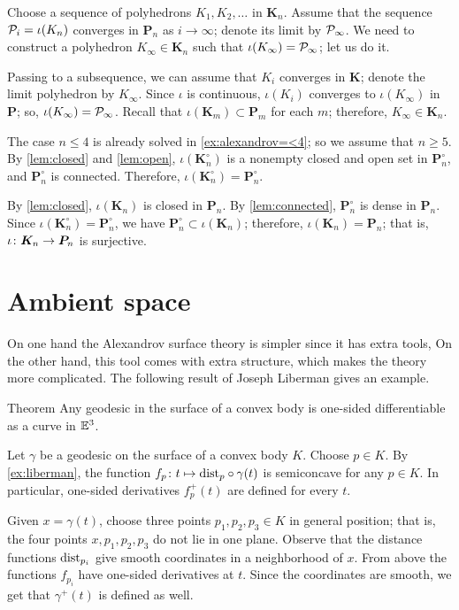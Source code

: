 Choose a sequence of polyhedrons $K_1,K_2,\ldots$ in $\bm{K}_n$.
Assume that the sequence $\mathcal{P}_i=\iota(K_n)$ converges in $\bm{P}_n$ as $i\to \infty$;
denote its limit by $\mathcal{P}_\infty$.
We need to construct a polyhedron $K_\infty\in \bm{K}_n$ such that $\iota(K_\infty)=\mathcal{P}_\infty$;
let us do it.

Passing to a subsequence, we can assume that $K_i$ converges in $\bm{K}$;
denote the limit polyhedron by $K_\infty$.
Since $\iota$ is continuous, $\iota(K_i)$ converges to $\iota(K_\infty)$ in~$\bm{P}$; so, $\iota(K_\infty)=\mathcal{P}_\infty$.
Recall that $\iota(\bm{K}_m)\subset\bm{P}_m$ for each $m$; therefore, $K_\infty\in \bm{K}_n$.


The case $n\le 4$ is already solved in \ref{ex:alexandrov=<4}; so we assume that $n\ge 5$.
By \ref{lem:closed} and \ref{lem:open},
$\iota(\bm{K}_n^\circ)$ is a nonempty closed and open set in $\bm{P}_n^\circ$, and $\bm{P}_n^\circ$ is connected.
Therefore, $\iota(\bm{K}_n^\circ)=\bm{P}_n^\circ$.

By \ref{lem:closed}, $\iota(\bm{K}_n)$ is closed in $\bm{P}_n$.
By \ref{lem:connected}, $\bm{P}_n^\circ$ is dense in $\bm{P}_n$.
Since $\iota(\bm{K}_n^\circ)=\bm{P}_n^\circ$, we have $\bm{P}_n^\circ\subset \iota(\bm{K}_n)$;
therefore, $\iota(\bm{K}_n)=\bm{P}_n$;
that is, $\iota\colon\bm{K}_n\to\bm{P}_n$ is surjective.
\qeds

\section{Ambient space}

On one hand the Alexandrov surface theory is simpler since it has extra tools,
On the other hand, this tool comes with extra structure, which makes the theory more complicated.
The following result of Joseph Liberman \cite{liberman} gives an example.

\begin{thm}{Theorem}
Any geodesic in the surface of a convex body is one-sided differentiable as a curve in $\mathbb{E}^3$.
\end{thm}

Let $\gamma$ be a geodesic on the surface of a convex body $K$.
Choose $p\in K$.
By \ref{ex:liberman}, the function $f_p\colon t\mapsto \mathrm{dist}_p\circ\gamma(t)$ is semiconcave for any $p\in K$.
In particular, one-sided derivatives $f_p^+(t)$ are defined for every $t$.

Given $x=\gamma(t)$, choose three points $p_1,p_2,p_3\in K$ in general position;
that is, the four points $x,p_1,p_2,p_3$ do not lie in one plane.
Observe that the distance functions $\mathrm{dist}_{p_i}$ give smooth coordinates in a neighborhood of $x$.
From above the functions $f_{p_i}$ have one-sided derivatives at $t$.
Since the coordinates are smooth, we get that $\gamma^+(t)$ is defined as well.
\qeds





